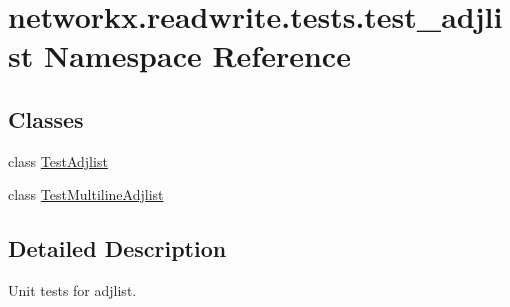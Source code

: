 \hypertarget{namespacenetworkx_1_1readwrite_1_1tests_1_1test__adjlist}{}\section{networkx.\+readwrite.\+tests.\+test\+\_\+adjlist Namespace Reference}
\label{namespacenetworkx_1_1readwrite_1_1tests_1_1test__adjlist}
\subsection*{Classes}
\begin{DoxyCompactItemize}
\item 
class \hyperlink{classnetworkx_1_1readwrite_1_1tests_1_1test__adjlist_1_1TestAdjlist}{Test\+Adjlist}
\item 
class \hyperlink{classnetworkx_1_1readwrite_1_1tests_1_1test__adjlist_1_1TestMultilineAdjlist}{Test\+Multiline\+Adjlist}
\end{DoxyCompactItemize}


\subsection{Detailed Description}
\begin{DoxyVerb}    Unit tests for adjlist.
\end{DoxyVerb}
 